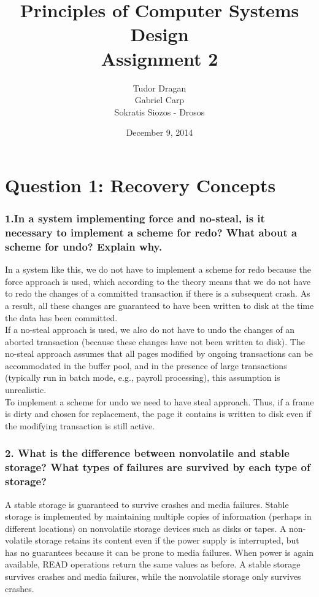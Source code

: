 \documentclass{article}      %
\title{\bf Principles of Computer Systems Design\\ {\Large Assignment 2}}  %
\author{Tudor Dragan\\
Gabriel Carp\\
Sokratis Siozos - Drosos}      %
\date{December 9, 2014}      %
\begin{document}

\maketitle                   %

\section*{Question 1: Recovery Concepts} 


\subsubsection*{1.In a system implementing force and no-steal, is it necessary to implement a scheme for redo? What about a scheme for undo? Explain why.}

In a system like this, we do not have to implement a scheme for redo because the force approach is used, which according to the theory means that we do not have to redo the changes of a committed transaction if there is a subsequent crash. As a result, all these changes are guaranteed to have been written to disk at the time the data has been committed. \\

If a no-steal approach is used, we also do not have to undo the changes of an aborted transaction (because these changes have not been written to disk). The no-steal approach assumes that all pages modified by ongoing transactions can be accommodated in the buffer pool, and in the presence of large transactions (typically run in batch mode, e.g., payroll processing), this assumption is unrealistic. \\

To implement a scheme for undo we need to have steal approach. Thus, if a frame is dirty and chosen for replacement, the page it contains is written to disk even if the modifying transaction is still active. 

\subsubsection*{2.  What is the difference between nonvolatile and stable storage? What types of failures are survived by each type of storage?}

A stable storage is guaranteed to survive crashes and media failures. Stable storage is implemented by maintaining multiple copies of information (perhaps in different locations) on nonvolatile storage devices such as disks or tapes. A non-volatile storage retains its content even if the power supply is interrupted, but has no guarantees because it can be prone to media failures. When power is again available, READ operations return the same values as before. A stable storage survives crashes and media failures, while the nonvolatile storage only survives crashes.\\
\end{document}
